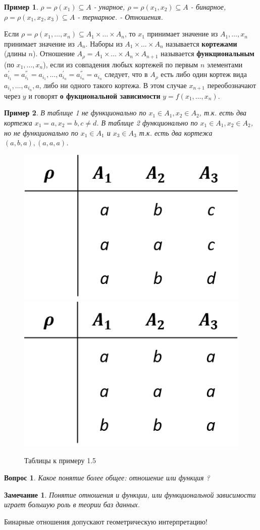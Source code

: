 \documentclass{article}
\newtheorem{example}{Пример}
\newtheorem{question}{Вопрос}
\newtheorem{Remark}{Замечание}
\numberwithin{example}{section}
\numberwithin{question}{section}
\numberwithin{Remark}{section}
\numberwithin{theorem}{section}
\numberwithin{definition}{section}
\numberwithin{proposition}{section}
\begin{document}
\begin{example}
$\rho=\rho(x_1)\subseteq A$ - унарное, $\rho=\rho(x_1,x_2)\subseteq A$ - бинарное, $\rho=\rho(x_1,x_2,x_3)\subseteq A$ - тернарное. - Отношения.
\end{example}
Если $\rho=\rho(x_1,\ldots,x_n)\subseteq A_1\times\ldots\times A_n$, то $x_1$ принимает значение из $A_1,\ldots,x_n$ принимает значение из $A_n$. Наборы из $A_1\times\ldots\times A_n$ называется \textbf{кортежами} (длины $n$). Отношение $A_{\rho}=A_1\times\ldots\times A_n\times A_{n+1}$ называется \textbf{функциональным} (по $x_1,\ldots,x_n$), если из совпадения любых кортежей по первым $n$ элементами $a_{i_1}^{'}=a_{i_1}^{''}=a_{i_1},\ldots,a_{i_n}^{'}=a_{i_n}^{''}=a_{i_n}$ следует, что в $A_{\rho}$ есть либо один кортеж вида $a_{i_1},\ldots,a_{i_n},a$, либо ни одного такого кортежа. В этом случае $x_{n+1}$ переобозначают через $y$ и говорят \textbf{о фукциональной зависимости} $y=f(x_1,\ldots,x_n)$.
\begin{example}
В таблице 1 не функционально по $x_1\in A_1,x_2\in A_2$, т.к. есть два кортежа $x_1=a,x_2=b,c\ne d$. В таблице 2 функционально по $x_1\in A_1,x_2\in A_2$, но не функционально по $x_1\in A_1$ и $x_3\in A_3$ т.к. есть два кортежа $(a,b,a),(a,a,a)$.
\end{example}
\begin{figure}[!htp]
	\centering
	\includegraphics[width=0.3\linewidth]{1-1}
	\includegraphics[width=0.3\linewidth]{1-1-2}
	\caption{Таблицы к примеру 1.5}
	\label{fig:1-1}
\end{figure}
\begin{question}
	Какое понятие более общее: отношение или функция ?
\end{question}
\begin{Remark}
	Понятие отношения и функции, или функциональной зависимости играет большую роль в теории баз данных.
\end{Remark}
Бинарные отношения допускают геометрическую интерпретацию!\\
\end{document}
